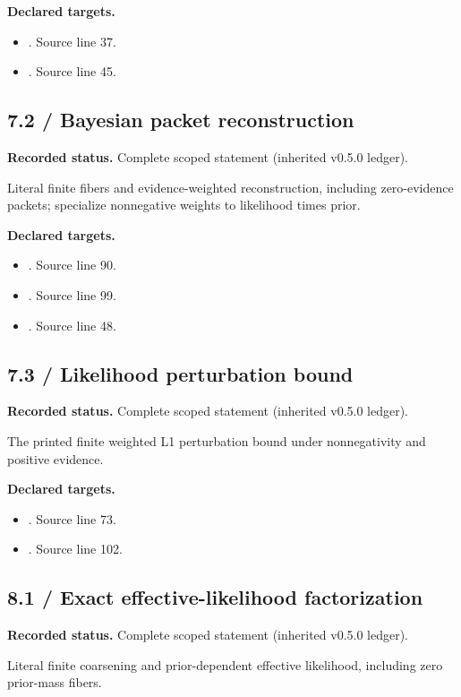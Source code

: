 \textbf{Declared targets.}\begin{itemize}
\item {}. Source line 37.
\item {}. Source line 45.
\end{itemize}
\subsection{7.2 / Bayesian packet reconstruction}
\label{result:7.2}
\textbf{Recorded status.} Complete scoped statement (inherited v0.5.0 ledger).\par
Literal finite fibers and evidence-weighted reconstruction, including zero-evidence packets; specialize nonnegative weights to likelihood times prior.

\textbf{Declared targets.}\begin{itemize}
\item {}. Source line 90.
\item {}. Source line 99.
\item {}. Source line 48.
\end{itemize}
\subsection{7.3 / Likelihood perturbation bound}
\label{result:7.3}
\textbf{Recorded status.} Complete scoped statement (inherited v0.5.0 ledger).\par
The printed finite weighted L1 perturbation bound under nonnegativity and positive evidence.

\textbf{Declared targets.}\begin{itemize}
\item {}. Source line 73.
\item {}. Source line 102.
\end{itemize}
\subsection{8.1 / Exact effective-likelihood factorization}
\label{result:8.1}
\textbf{Recorded status.} Complete scoped statement (inherited v0.5.0 ledger).\par
Literal finite coarsening and prior-dependent effective likelihood, including zero prior-mass fibers.

